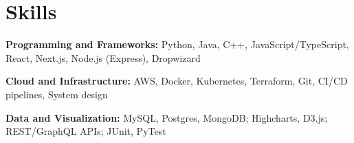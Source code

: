 \documentclass[A4,10pt]{article}
\begin{document}
 \vspace{-4.5mm}
 
\section{\textcolor{NavyBlue}{Skills}}
 \begin{itemize}[leftmargin=0in, label={}]
    \normalsize{
    \item{
    \textbf{Programming and Frameworks:}  Python, Java, C++, JavaScript/TypeScript, React, Next.js, Node.js (Express), Dropwizard }
     \vspace{-1.5mm}
    \item {\textbf{Cloud and Infrastructure:} AWS, Docker, Kubernetes, Terraform, Git, CI/CD pipelines, System design
    } 
     \vspace{-1.5mm}
    \item {\textbf{Data and Visualization:} MySQL, Postgres, MongoDB; Highcharts, D3.js; REST/GraphQL APIs; JUnit, PyTest}
}
 \end{itemize}

 \vspace{-4.5mm}
\end{document}

